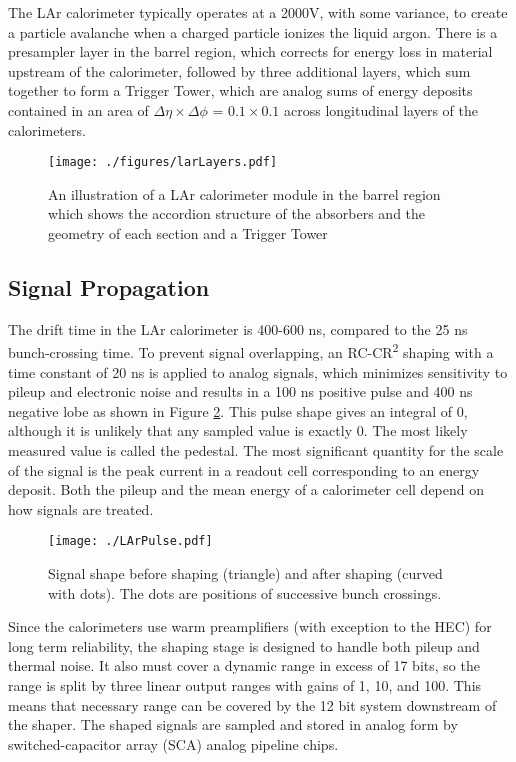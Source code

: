 The LAr calorimeter typically operates at a 2000V, with some variance, to create a particle avalanche when a charged particle ionizes the liquid argon.  There is a presampler layer in the barrel region, which corrects for energy loss in material upstream of the calorimeter, followed by three additional layers, which sum together to form a Trigger Tower, which are analog sums of energy deposits contained in an area of $\Delta\eta \times \Delta\phi$ = $0.1 \times 0.1$ across longitudinal layers of the calorimeters.\\

\begin{figure}[h!]
  \centering
	\texttt{[image: ./figures/larLayers.pdf]}
\caption{\label{fig:larLayout}{ An illustration of a LAr calorimeter module in the barrel region which shows the accordion structure of the absorbers and the geometry of each section and a Trigger Tower\cite{LArTDR}  }} %
\end{figure}


\subsection{Signal Propagation}
The drift time in the LAr calorimeter is 400-600 ns, compared to the 25 ns bunch-crossing time.  To prevent signal overlapping, an RC-CR\textsuperscript{2} shaping with a time constant of 20 ns is applied to analog signals, which minimizes sensitivity to pileup and electronic noise and results in a 100 ns positive pulse and 400 ns negative lobe as shown in Figure \ref{fig:larPulse}.  This pulse shape gives an integral of 0, although it is unlikely that any sampled value is exactly 0.  The most likely measured value is called the pedestal.  The most significant quantity for the scale of the signal is the peak current in a readout cell corresponding to an energy deposit.  Both the pileup and the mean energy of a calorimeter cell depend on how signals are treated.\\

\begin{figure}[h!]
  \centering
	\texttt{[image: ./LArPulse.pdf]}
\caption{\label{fig:larPulse}{ Signal shape before shaping (triangle) and after shaping (curved with dots).  The dots are positions of successive bunch crossings\cite{DetectorPaper:2008}. }} 
\end{figure}


Since the calorimeters use warm preamplifiers (with exception to the HEC) for long term reliability, the shaping stage is designed to handle both pileup and thermal noise.  It also must cover a dynamic range in excess of 17 bits, so the range is split by three linear output ranges with gains of 1, 10, and 100.  This means that necessary range can be covered by the 12 bit system downstream of the shaper.  The shaped signals are sampled and stored in analog form by switched-capacitor array (SCA) analog pipeline chips.  \\

